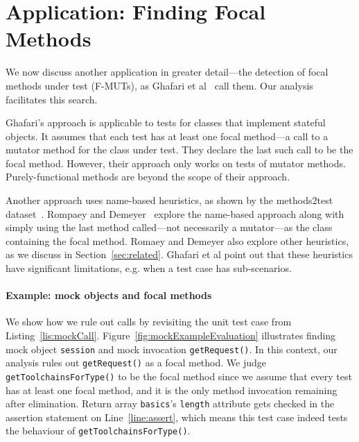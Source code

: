 \section{Application: Finding Focal Methods}
\label{sec:focal}

We now discuss another application in greater detail---the detection of focal methods under test
(F-MUTs), as Ghafari et
al~\cite{ghafari15:_autom} call them.
Our analysis facilitates this search.

Ghafari's approach is applicable to tests for classes that implement
stateful objects. It assumes that each test has at least one focal
method---a call to a mutator method for the class under test.
They declare the last such call to be the focal method. However, their approach 
only works on tests of mutator methods.  Purely-functional methods are beyond the scope of their approach.

Another approach uses name-based heuristics, 
as shown by the methods2test
dataset~\cite{tufano2020unit}.
Rompaey and
Demeyer~\cite{rompaey09:_estab_traceab_links_unit_test} explore the
name-based approach along with simply using the last method called---not necessarily a mutator---as the class containing the focal method.  Romaey and Demeyer also
explore other heuristics, as we discuss in Section~\ref{sec:related}. Ghafari et al point out
that these heuristics have significant limitations, e.g. when a
test case has sub-scenarios.

\paragraph{Example: mock objects and focal methods} We show how we rule out calls by revisiting the unit test case from Listing~\ref{lis:mockCall}. Figure~\ref{fig:mockExampleEvaluation} illustrates finding mock object \texttt{session} and mock invocation \texttt{getRequest()}. In this context, our analysis rules out \texttt{getRequest()} as a focal method. We judge \texttt{getToolchainsForType()} to be the focal method since we assume that every test has at least one focal method, and it is the only method invocation remaining after elimination. Return array \texttt{basics}'s \texttt{length} attribute gets checked in the assertion statement on Line~\ref{line:assert}, which means this test case indeed tests the behaviour of \texttt{getToolchainsForType()}. 

